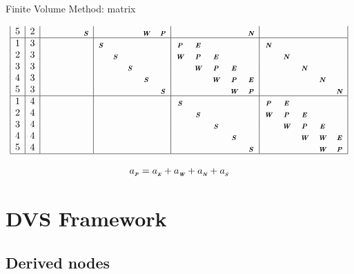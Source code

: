 \documentclass[handout]{beamer}
\newcommand{\mbiu}[1]{_{\textbf{\em #1}}}
\begin{document}
\begin{frame}{Finite Volume Method: matrix}
\begin{tiny}
\begin{equation*}
\begin{array}{|c|c|ccccc|ccccc|ccccc|ccccc|}
5 & 2 &   &   &   &   & \mbiu{S}   &   &   &  & \mbiu{W} & \mbiu{P} &   &   &   &  &  \mbiu{N}   &   &   &   &  & \\
\hline
1 & 3 &   &   &   &   &   & \mbiu{S}   &   &   &   &  & \mbiu{P} & \mbiu{E}   &   &   &  & \mbiu{N}   &   &   &  & \\
2 & 3 &   &   &   &   &   &   & \mbiu{S}   &   &   &  & \mbiu{W} & \mbiu{P} & \mbiu{E}   &   &  &  & \mbiu{N}   &   &  &   \\
3 & 3 &   &   &   &   &   &   &   & \mbiu{S}   &   &   &  & \mbiu{W} & \mbiu{P} & \mbiu{E}   &   &  &  & \mbiu{N}   &  & \\
4 & 3 &   &   &   &   &   &   &   &   & \mbiu{S}   &   &  &  & \mbiu{W} & \mbiu{P} & \mbiu{E}   &   &  &  & \mbiu{N}  & \\
5 & 3 &   &   &   &   &   &   &   &   &   & \mbiu{S}   &   &  &  & \mbiu{W} & \mbiu{P} &   &   &   &   & \mbiu{N} \\
\hline
1 & 4 &   &   &   &   &   &   &   &   &   &   & \mbiu{S}   &   &   &   &  & \mbiu{P} & \mbiu{E}   &   &  &  \\
2 & 4 &   &   &   &   &   &   &   &   &   &   &   & \mbiu{S}   &   &   &   & \mbiu{W} & \mbiu{P} & \mbiu{E}  & &     \\
3 & 4 &   &   &   &   &   &   &   &   &   &   &   &   & \mbiu{S}   &   &  &  & \mbiu{W} & \mbiu{P} & \mbiu{E}  & \\
4 & 4 &   &   &   &   &   &   &   &   &   &   &   &   &   & \mbiu{S}   &   &  &  & \mbiu{W} & \mbiu{W} & \mbiu{E} \\
5 & 4 &   &   &   &   &   &   &   &   &   &   &   &   &   &   & \mbiu{S}   &   &   &  & \mbiu{W} & \mbiu{P} \\
\hline
\end{array}
\end{equation*}

\strut

\[
a_{\mbiu{P}} = a_{\mbiu{E}} + a_{\mbiu{W}} + a_{\mbiu{N}} + a_{\mbiu{S}}
\]

\end{tiny}

\end{frame}

\section{DVS Framework}

\subsection{Derived nodes}
\end{document}
